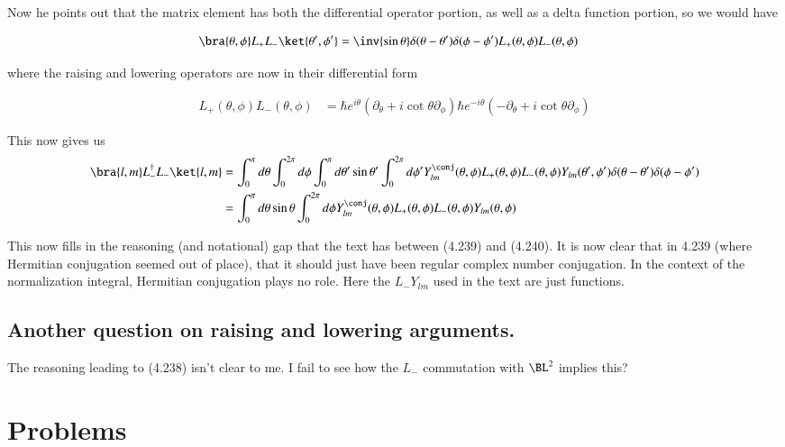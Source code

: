 Now he points out that the matrix element has both the differential operator portion, as well as a delta function portion, so we would have

\begin{align*}
\bra{\theta,\phi} L_{+} L_{-} \ket{\theta',\phi'}
&=
\inv{\sin\theta} \delta(\theta-\theta') \delta(\phi - \phi') 
L_{+}(\theta,\phi) L_{-} (\theta, \phi)
\end{align*}

where the raising and lowering operators are now in their differential form

\begin{align*}
L_{+} (\theta, \phi)
L_{-} (\theta, \phi)
&=
\hbar e^{i\theta} \left( \partial_\theta + i\cot\theta \partial_\phi \right)
\hbar e^{- i\theta} \left( - \partial_\theta + i\cot\theta \partial_\phi \right)
\end{align*}

This now gives us
\begin{align*}
\bra{l,m} L_{-}^\dagger L_{-} \ket{l,m}
&=
\int_{0}^\pi d\theta \int_0^{2\pi} d\phi 
\int_{0}^\pi d\theta' \sin\theta' \int_0^{2\pi} d\phi' 
Y_{lm}^\conj(\theta, \phi)
L_{+}(\theta, \phi) L_{-}(\theta, \phi) 
Y_{lm}(\theta', \phi')
\delta(\theta-\theta') \delta(\phi - \phi')  \\
&=
\int_{0}^\pi d\theta \sin\theta \int_0^{2\pi} d\phi 
Y_{lm}^\conj(\theta, \phi)
L_{+}(\theta, \phi) L_{-}(\theta, \phi) 
Y_{lm}(\theta, \phi)
\end{align*}

This now fills in the reasoning (and notational) gap that the text has between (4.239) and (4.240).  It is now clear that in 4.239 (where Hermitian conjugation seemed out of place), that it should just have been regular complex number conjugation.  In the context of the normalization integral, Hermitian conjugation plays no role.  Here the $L_{-} Y_{lm}$ used in the text are just functions.

\subsection{Another question on raising and lowering arguments.}

The reasoning leading to (4.238) isn't clear to me.  I fail to see how the $L_{-}$ commutation with $\BL^2$ implies this?

\section{Problems}

